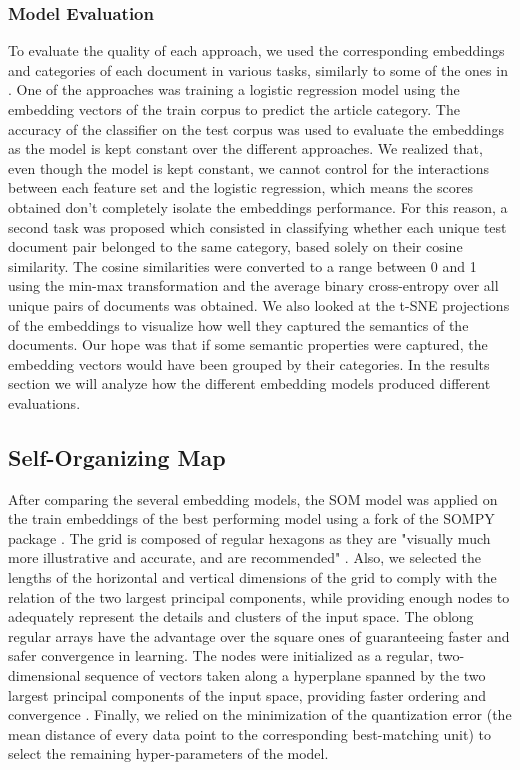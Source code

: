 \documentclass[a4paper]{article}
\begin{document}
\subsubsection*{Model Evaluation}
To evaluate the quality of each approach, we used the corresponding embeddings and categories of each document in various tasks, similarly to some of the ones in \citet{Conneau2018}. One of the approaches was training a logistic regression model using the embedding vectors of the train corpus to predict the article category. The accuracy of the classifier on the test corpus was used to evaluate the embeddings as the model is kept constant over the different approaches. We realized that, even though the model is kept constant, we cannot control for the interactions between each feature set and the logistic regression, which means the scores obtained don't completely isolate the embeddings performance. For this reason, a second task was proposed which consisted in classifying whether each unique test document pair belonged to the same category, based solely on their cosine similarity. The cosine similarities were converted to a range between 0 and 1 using the min-max transformation and the average binary cross-entropy over all unique pairs of documents was obtained. We also looked at the t-SNE projections of the embeddings to visualize how well they captured the semantics of the documents. Our hope was that if some semantic properties were captured, the embedding vectors would have been grouped by their categories. In the results section we will analyze how the different embedding models produced different evaluations.
\subsection*{Self-Organizing Map}
After comparing the several embedding models, the SOM model was applied on the train embeddings of the best performing model using a fork of the SOMPY package \citep{Moosavi2014}. The grid is composed of regular hexagons as they are "visually much more illustrative and accurate, and are recommended" \citep{Kohonen2013}. Also, we selected the lengths of the horizontal and vertical dimensions of the grid to comply with the relation of the two largest principal components, while providing enough nodes to adequately represent the details and clusters of the input space. The oblong regular arrays have the advantage over the square ones of guaranteeing faster and safer convergence in learning. The nodes were initialized as a regular, two-dimensional sequence of vectors taken along a hyperplane spanned by the two largest principal components of the input space, providing faster ordering and convergence \citep{Kohonen2001}. Finally, we relied on the minimization of the quantization error (the mean distance of every data point to the corresponding best-matching unit) to select the remaining hyper-parameters of the model.
\end{document}
